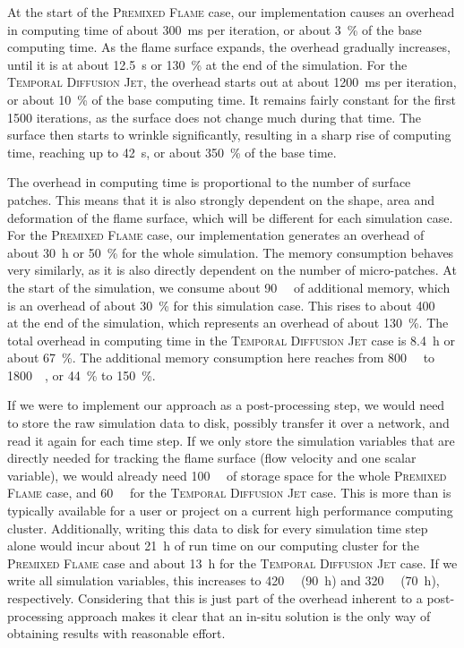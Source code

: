 %
At the start of the \textsc{Premixed Flame} case, our implementation causes an
overhead in computing time of about \SI{300}{\milli\second} per iteration, or
about \SI{3}{\percent} of the base computing time.
%
As the flame surface expands, the overhead gradually increases, until it is at
about \SI{12.5}{\second} or \SI{130}{\percent} at the end of the simulation.
%
For the \textsc{Temporal Diffusion Jet}, the overhead starts out at about
\SI{1200}{\milli\second} per iteration, or about \SI{10}{\percent} of the base
computing time.
%
It remains fairly constant for the first \num{1500} iterations, as the surface
does not change much during that time.
%
The surface then starts to wrinkle significantly, resulting in a sharp rise of
computing time, reaching up to \SI{42}{\second}, or about \SI{350}{\percent} of
the base time.
%

%
The overhead in computing time is proportional to the number of surface patches.
%
This means that it is also strongly dependent on the shape, area and deformation
of the flame surface, which will be different for each simulation case.
%
For the \textsc{Premixed Flame} case, our implementation generates an overhead
of about \SI{30}{\hour} or \SI{50}{\percent} for the whole simulation.
%
The memory consumption behaves very similarly, as it is also directly dependent
on the number of micro-patches.
%
At the start of the simulation, we consume about \SI{90}{\giga\byte} of
additional memory, which is an overhead of about \SI{30}{\percent} for this
simulation case.
%
This rises to about \SI{400}{\giga\byte} at the end of the simulation, which
represents an overhead of about \SI{130}{\percent}.
%
The total overhead in computing time in the \textsc{Temporal Diffusion
Jet} case is \SI{8.4}{\hour} or about \SI{67}{\percent}.
%
The additional memory consumption here reaches from \SI{800}{\giga\byte} to
\SI{1800}{\giga\byte}, or \SI{44}{\percent} to \SI{150}{\percent}.
%

%
If we were to implement our approach as a post-processing step, we would need to
store the raw simulation data to disk, possibly transfer it over a network, and
read it again for each time step.
%
If we only store the simulation variables that are directly needed for tracking
the flame surface (flow velocity and one scalar variable), we would already need
\SI{100}{\tera\byte} of storage space for the whole \textsc{Premixed Flame}
case, and \SI{60}{\tera\byte} for the \textsc{Temporal Diffusion Jet} case.
%
This is more than is typically available for a user or project on a current high
performance computing cluster.
%
Additionally, writing this data to disk for every simulation time step alone
would incur about \SI{21}{\hour} of run time on our computing cluster for the
\textsc{Premixed Flame} case and about \SI{13}{\hour} for the \textsc{Temporal
Diffusion Jet} case.
%
If we write all simulation variables, this increases to \SI{420}{\tera\byte}
(\SI{90}{\hour}) and \SI{320}{\tera\byte} (\SI{70}{\hour}), respectively.
%
Considering that this is just part of the overhead inherent to a post-processing
approach makes it clear that an in-situ solution is the only way of obtaining
results with reasonable effort.
%

%
